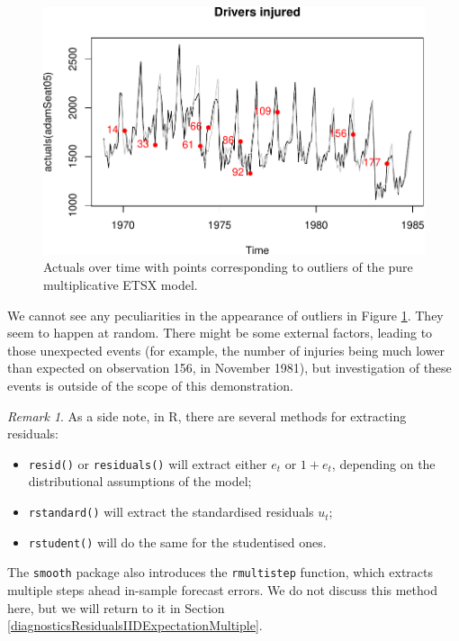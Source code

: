 \documentclass[
]{book}
\providecommand{\tightlist}{%
  \setlength{\itemsep}{0pt}\setlength{\parskip}{0pt}}
\theoremstyle{definition}
\theoremstyle{definition}
\theoremstyle{definition}
\theoremstyle{definition}
\theoremstyle{remark}
\newtheorem*{remark}{Remark}
\begin{document}
\begin{figure}
\centering
\includegraphics{Svetunkov--2022----ADAM_files/figure-latex/adamSeat05Outliers-1.pdf}
\caption{\label{fig:adamSeat05Outliers}Actuals over time with points corresponding to outliers of the pure multiplicative ETSX model.}
\end{figure}

We cannot see any peculiarities in the appearance of outliers in Figure \ref{fig:adamSeat05Outliers}. They seem to happen at random. There might be some external factors, leading to those unexpected events (for example, the number of injuries being much lower than expected on observation 156, in November 1981), but investigation of these events is outside of the scope of this demonstration.

\begin{remark}
As a side note, in R, there are several methods for extracting residuals:

\begin{itemize}
\tightlist
\item
  \texttt{resid()} or \texttt{residuals()} will extract either \(e_t\) or \(1+e_t\), depending on the distributional assumptions of the model;
\item
  \texttt{rstandard()} will extract the standardised residuals \(u_t\);
\item
  \texttt{rstudent()} will do the same for the studentised ones.
\end{itemize}

The \texttt{smooth} package also introduces the \texttt{rmultistep} function, which extracts multiple steps ahead in-sample forecast errors. We do not discuss this method here, but we will return to it in Section \ref{diagnosticsResidualsIIDExpectationMultiple}.
\end{remark}
\end{document}
